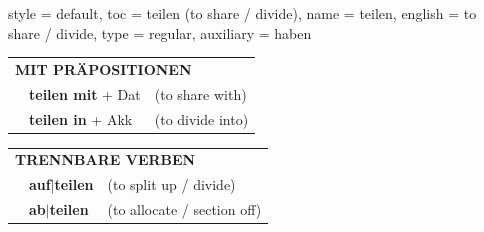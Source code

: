 \begin{verbentry}{
  style = {default},
  toc = {teilen (to share / divide)},
  name = {teilen},
  english = {to share / divide},
  type = {regular},
  auxiliary = {haben}
}
\vspace{10pt}

\begin{tabular}{lll}
\multicolumn{3}{l}{\textbf{MIT PRÄPOSITIONEN}}\\
& \textbf{teilen mit} + Dat & (to share with)\\
& \textbf{teilen in} + Akk & (to divide into)\\
\end{tabular}
\hfill
\begin{tabular}{lll}
\multicolumn{3}{l}{\textbf{TRENNBARE VERBEN}}\\
& \textbf{auf$|$teilen} & (to split up / divide)\\
& \textbf{ab$|$teilen} & (to allocate / section off)\\
\end{tabular}
\vspace{-5pt}
\end{verbentry}


